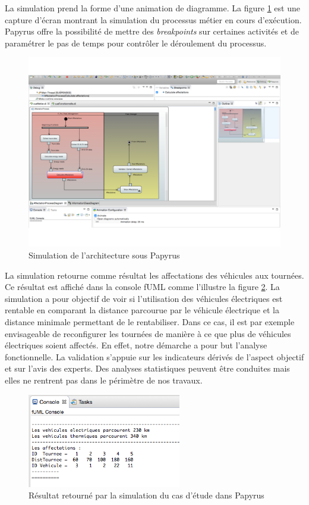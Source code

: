 La simulation prend la forme d'une animation de diagramme. La figure
\ref{fig:simu_capture_ecran} est une capture d'écran montrant la simulation du processus métier
en cours d'exécution. Papyrus offre la possibilité de mettre des \emph{breakpoints} sur
certaines activités et de paramétrer le pas de temps pour contrôler le
déroulement du processus.

\begin{figure}[!htbp]
  \centering
  \includegraphics[angle=90, width=1\textwidth]{figures/5_implementation/simu_capture_ecran.pdf}
 \caption{Simulation de l'architecture sous Papyrus}
 \label{fig:simu_capture_ecran}
\end{figure}

La simulation retourne comme résultat les affectations des véhicules aux
tournées. Ce résultat est affiché dans la console fUML comme l'illustre la
figure \ref{fig:resultat_simu}. La simulation a pour objectif de voir si
l'utilisation des véhicules électriques est rentable en comparant la distance
parcourue par le véhicule électrique et la distance minimale permettant de le
rentabiliser. Dans ce cas, il est par exemple envisageable de reconfigurer les
tournées de manière à ce que plus de véhicules électriques soient affectés. En
effet, notre démarche a pour but l'analyse fonctionnelle. La validation s'appuie
sur les indicateurs dérivés de l'aspect objectif et sur l'avis des experts. Des
analyses statistiques peuvent être conduites mais elles ne rentrent pas dans le
périmètre de nos travaux.

\begin{figure}[!htbp]
  \centering
  \includegraphics[width=0.6\textwidth]{figures/5_implementation/resultat_simu.png}
 \caption{Résultat retourné par la simulation du cas d'étude dans Papyrus}
 \label{fig:resultat_simu}
\end{figure} 

